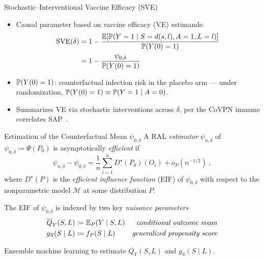 \documentclass{beamer}
\begin{document}
\begin{frame}[c]{Stochastic--Interventional Vaccine Efficacy (SVE)}

\begin{center}
\begin{itemize}
  \itemsep8pt
  \item Causal parameter based on vaccine efficacy (VE) estimands:
  \begin{align*}
    \text{SVE}(\delta) &= 1 - \frac{\mathbb{E}[\mathbb{P}(Y = 1 \mid S = d(s, l), A = 1,
                                    L = l)]}{\mathbb{P}(Y(0)=1)} \\
                       &= 1 - \frac{\psi_{0, \delta}}{\mathbb{P}(Y(0)=1)}
  \end{align*}
  \item $\mathbb{P}(Y(0)=1)$: counterfactual infection risk in the placebo arm ---
    under randomization, $\mathbb{P}(Y(0)=1) \equiv \mathbb{P}(Y=1 \mid A=0)$.
  \item Summarizes VE via stochastic interventions across $\delta$, per the
    CoVPN immune correlates SAP\footnotemark~\citep{gilbert2021covpn,
    gilbert2021immune}.
\end{itemize}
\end{center}

\note{
}


\end{frame}


\begin{frame}{Estimation of the Counterfactual Mean $\psi_{0,\delta}$}
A RAL \textit{estimator} $\psi_{n,\delta}$ of $\psi_{0,\delta} \coloneqq
\Psi(P_0)$ is asymptotically \textit{efficient} if
\[
  \psi_{n,\delta} - \psi_{0, \delta} = \frac{1}{n} \sum_{i=1}^n
  D^{\star}(P_0)(O_i) + o_P(n^{-1/2}) \ ,
\]
where $D^{\star}(P)$ is the \textit{efficient influence function} (EIF) of
$\psi_{0,\delta}$ with respect to the nonparametric model $\mathcal{M}$ at some
distribution $P$.
\vspace{0.2cm}

The EIF of $\psi_{0,\delta}$ is indexed by two key \textit{nuisance parameters}
\begin{align*}
  \overline{Q}_{Y}(S,L) &\coloneqq \mathbb{E}_{P}(Y \mid S, L) &
      \mbox{\textit{conditional outcome mean}} \\
  g_{S}(S \mid L) &\coloneqq f_P(S \mid L) &
    \mbox{\textit{generalized propensity score}}
\end{align*}
\vspace{-0.2cm}

Ensemble machine learning to estimate $\overline{Q}_{Y}(S,L)$ and $g_{S}(S \mid
L)$.

\note{
}

\end{frame}
\end{document}
